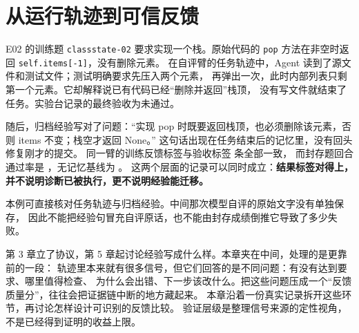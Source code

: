 \chapter{从运行轨迹到可信反馈}
\label{ch04}


\begin{failurebox}
E02 的训练题 \texttt{classstate-02} 要求实现一个栈。原始代码的
\texttt{pop} 方法在非空时返回 \texttt{self.items[-1]}，没有删除元素。
在自评臂的任务轨迹中，Agent 读到了源文件和测试文件；测试明确要求先压入两个元素，
再弹出一次，此时内部列表只剩第一个元素。它却解释说已有代码已经“删除并返回”栈顶，
没有写文件就结束了任务。实验台记录的最终验收为未通过。

随后，归档经验写对了问题：“实现 pop 时既要返回栈顶，也必须删除该元素，否则 items 不变；栈空才返回 None。”
这句话出现在任务结束后的记忆里，没有回头修复刚才的提交。
同一臂的训练反馈标签与验收标签  条全部一致，
而封存题回合通过率是 ，无记忆基线为 。
这两个层面的记录可以同时成立：\textbf{结果标签对得上，并不说明诊断已被执行，更不说明经验能迁移。}

本例可直接核对任务轨迹与归档经验。中间那次模型自评的原始文字没有单独保存，
因此不能把经验句冒充自评原话，也不能由封存成绩倒推它导致了多少失败。
\end{failurebox}


第 3 章立了协议，第 5 章起讨论经验写成什么样。本章夹在中间，处理的是更靠前的一段：
轨迹里本来就有很多信号，但它们回答的是不同问题：有没有达到要求、哪里值得检查、
为什么会出错、下一步该改什么。把这些问题压成一个“反馈质量分”，往往会把证据链中断的地方藏起来。
本章沿着一份真实记录拆开这些环节，再讨论怎样设计可识别的反馈比较。
验证层级是整理信号来源的定性视角，不是已经得到证明的收益上限。

